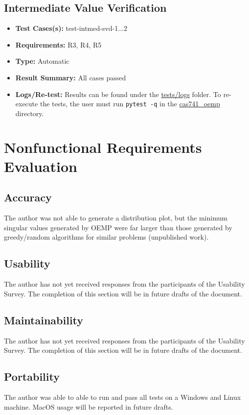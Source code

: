\documentclass[12pt, titlepage]{article}
\begin{document}
\subsection{Intermediate Value Verification}
\begin{itemize}
  \item \textbf{Test Cases(s):} test-intmed-svd-1...2
  \item \textbf{Requirements:} R3, R4, R5
  \item \textbf{Type:} Automatic
  \item \textbf{Result Summary:} All cases passed
  \item \textbf{Logs/Re-test:} Results can be found under the \href{https://github.com/husseinsd1/optimal-em-arrangement/tree/main/cas741-oemp/cas741_oemp/tests/logs}{tests/logs} folder. To re-execute the tests, the user must run \texttt{pytest -q} in the \href{https://github.com/husseinsd1/optimal-em-arrangement/tree/main/cas741-oemp/cas741_oemp}{cas741\_oemp} directory.
\end{itemize}

\section{Nonfunctional Requirements Evaluation} \label{nfr_ev}

\subsection{Accuracy}
The author was not able to generate a distribution plot, but the minimum singular values generated by OEMP were far larger than those generated by greedy/random algorithms for similar problems (unpublished work).  		


\subsection{Usability}
The author has not yet received responses from the participants of the Usability Survey. The completion of this section will be in future drafts of the document. 

\subsection{Maintainability}
The author has not yet received responses from the participants of the Usability Survey. The completion of this section will be in future drafts of the document. 

\subsection{Portability}
The author was able to able to run and pass all tests on a Windows and Linux machine. MacOS usage will be reported in future drafts.
\end{document}
